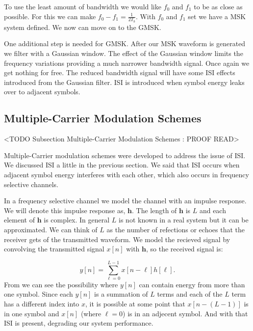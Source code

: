 To use the least amount of bandwidth we would like $f_0$ and $f_1$ to be as close as possible. For this we can make $f_0-f_1=\frac{1}{2T_b}$. With $f_0$ and $f_1$ set we have a \ac{MSK} system defined. We now can move on to the \ac{GMSK}.

One additional step is needed for \ac{GMSK}. After our \ac{MSK} waveform is generated we filter with a Gaussian window. The effect of the Gaussian window limits the frequency variations providing a much narrower bandwidth signal. Once again we get nothing for free. The reduced bandwidth signal will have some \ac{ISI} effects introduced from the Gaussian filter. \ac{ISI} is introduced when symbol energy leaks over to adjacent symbols.

	
	
\subsection{Multiple-Carrier Modulation Schemes}
	<TODO Subsection Multiple-Carrier Modulation Schemes : PROOF READ>

Multiple-Carrier modulation schemes were developed to address the issue of \ac{ISI}. We discussed \ac{ISI} a little in the previous section. We said that \ac{ISI} occurs when adjacent symbol energy interferes with each other, which also occurs in frequency selective channels.

In a frequency selective channel we model the channel with an impulse response. We will denote this impulse response as, $\mathbf{h}$. The length of $\mathbf{h}$ is $L$ and each element of $\mathbf{h}$ is complex. In general $L$ is not known in a real system but it can be approximated. We can think of $L$ as the number of refections or echoes that the receiver gets of the transmitted waveform. We model the recieved signal by convolving the transmitted signal $x[n]$ with $\mathbf{h}$, so the received signal is:

\begin{equation}
\label{eq:conv}
y[n] = \sum_{\ell=0}^{L-1}x[n-\ell]h[\ell].
\end{equation}
\noindent
From  we can see the possibility where $y[n]$ can contain energy from more than one symbol. Since each $y[n]$ is a summation of $L$ terms and each of the $L$ term has a different index into $x$, it is possible at some point that $x[n-(L-1)]$ is in one symbol and $x[n]$ (where $\ell=0$) is in an adjecent symbol. And with that \ac{ISI} is present, degrading our system performance.

